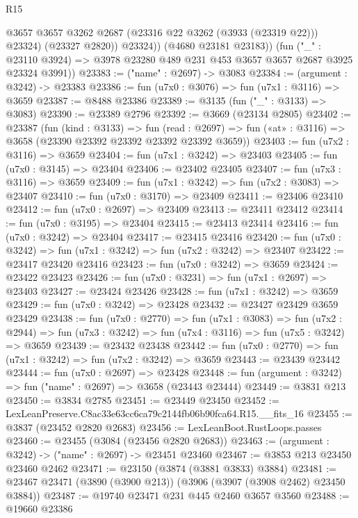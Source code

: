 \begin{lexlean}{R15}
\begin{coremodule}
                @3657
                @3657
                @3262
                @2687
                (@23316 @22 @3262 (@3933 (@23319 @22)))
                @23324)
              (@23327 @2820))
            @23324))
        (@4680 @23181 @23183))
      (fun ("_" : @23110 @3924) =>
      @3978 @23280 @489 @231 @453 @3657 @3657 @2687 @3925 @23324 @3991))
@23383 := ("name" : @2697) -> @3083
@23384 := (argument : @3242) -> @23383
@23386 := fun (u7x0 : @3076) => fun (u7x1 : @3116) => @3659
@23387 := @8488 @23386
@23389 := @3135 (fun ("_" : @3133) => @3083)
@23390 := @23389 @2796
@23392 := @3669 (@23134 @2805)
@23402 := @23387
    (fun (kind : @3133) =>
    fun (read : @2697) => fun («at» : @3116) => @3658 (@23390 @23392 @23392 @23392 @23392 @3659))
@23403 := fun (u7x2 : @3116) => @3659
@23404 := fun (u7x1 : @3242) => @23403
@23405 := fun (u7x0 : @3145) => @23404
@23406 := @23402 @23405
@23407 := fun (u7x3 : @3116) => @3659
@23409 := fun (u7x1 : @3242) => fun (u7x2 : @3083) => @23407
@23410 := fun (u7x0 : @3170) => @23409
@23411 := @23406 @23410
@23412 := fun (u7x0 : @2697) => @23409
@23413 := @23411 @23412
@23414 := fun (u7x0 : @3195) => @23404
@23415 := @23413 @23414
@23416 := fun (u7x0 : @3242) => @23404
@23417 := @23415 @23416
@23420 := fun (u7x0 : @3242) => fun (u7x1 : @3242) => fun (u7x2 : @3242) => @23407
@23422 := @23417 @23420 @23416
@23423 := fun (u7x0 : @3242) => @3659
@23424 := @23422 @23423
@23426 := fun (u7x0 : @3231) => fun (u7x1 : @2697) => @23403
@23427 := @23424 @23426
@23428 := fun (u7x1 : @3242) => @3659
@23429 := fun (u7x0 : @3242) => @23428
@23432 := @23427 @23429 @3659 @23429
@23438 := fun (u7x0 : @2770) =>
  fun (u7x1 : @3083) =>
  fun (u7x2 : @2944) => fun (u7x3 : @3242) => fun (u7x4 : @3116) => fun (u7x5 : @3242) => @3659
@23439 := @23432 @23438
@23442 := fun (u7x0 : @2770) => fun (u7x1 : @3242) => fun (u7x2 : @3242) => @3659
@23443 := @23439 @23442
@23444 := fun (u7x0 : @2697) => @23428
@23448 := fun (argument : @3242) => fun ("name" : @2697) => @3658 (@23443 @23444)
@23449 := @3831 @213
@23450 := @3834 @2785
@23451 := @23449 @23450
@23452 := LexLeanPreserve.C8ac33e63cc6ca79c2144fb06b90fca64.R15.__fits_16
@23455 := @3837 (@23452 @2820 @2683)
@23456 := LexLeanBoot.RustLoops.passes
@23460 := @23455 (@3084 (@23456 @2820 @2683))
@23463 := (argument : @3242) -> ("name" : @2697) -> @23451 @23460
@23467 := @3853 @213 @23450 @23460 @2462
@23471 := @23150 (@3874 (@3881 @3833) @3884)
@23481 := @23467 @23471 (@3890 (@3900 @213)) (@3906 (@3907 (@3908 @2462) @23450 @3884))
@23487 := @19740 @23471 @231 @445 @2460 @3657 @3560
@23488 := @19660 @23386

\end{coremodule}
\end{lexlean}
